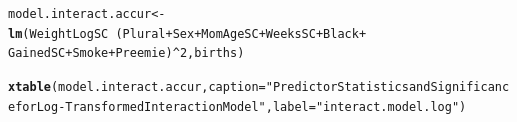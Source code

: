 \documentclass{article}\usepackage[]{graphicx}\usepackage[]{xcolor}
\makeatletter
\newcommand{\hlnum}[1]{\textcolor[rgb]{0.686,0.059,0.569}{#1}}%
\newcommand{\hlstr}[1]{\textcolor[rgb]{0.192,0.494,0.8}{#1}}%
\newcommand{\hlopt}[1]{\textcolor[rgb]{0,0,0}{#1}}%
\newcommand{\hlstd}[1]{\textcolor[rgb]{0.345,0.345,0.345}{#1}}%
\newcommand{\hlkwb}[1]{\textcolor[rgb]{0.69,0.353,0.396}{#1}}%
\newcommand{\hlkwc}[1]{\textcolor[rgb]{0.333,0.667,0.333}{#1}}%
\newcommand{\hlkwd}[1]{\textcolor[rgb]{0.737,0.353,0.396}{\textbf{#1}}}%
\newenvironment{kframe}{%
 \def\at@end@of@kframe{}%
 \ifinner\ifhmode%
  \def\at@end@of@kframe{\end{minipage}}%
  \begin{minipage}{\columnwidth}%
 \fi\fi%
 \def\FrameCommand##1{\hskip\@totalleftmargin \hskip-\fboxsep
 \colorbox{shadecolor}{##1}\hskip-\fboxsep
     \hskip-\linewidth \hskip-\@totalleftmargin \hskip\columnwidth}%
 \MakeFramed {\advance\hsize-\width
   \@totalleftmargin\z@ \linewidth\hsize
   \@setminipage}}%
 {\par\unskip\endMakeFramed%
 \at@end@of@kframe}
\newenvironment{knitrout}{}{} %
\makeatother
\begin{document}
\begin{knitrout}
\color{fgcolor}\begin{kframe}
\begin{alltt}
\hlstd{model.interact.accur} \hlkwb{<-} \hlkwd{lm}\hlstd{(WeightLogSC} \hlopt{~} \hlstd{(Plural} \hlopt{+} \hlstd{Sex} \hlopt{+} \hlstd{MomAgeSC} \hlopt{+} \hlstd{WeeksSC} \hlopt{+} \hlstd{Black} \hlopt{+}
                             \hlstd{GainedSC} \hlopt{+} \hlstd{Smoke} \hlopt{+} \hlstd{Preemie)}\hlopt{^}\hlnum{2}\hlstd{, births)}

\hlkwd{xtable}\hlstd{(model.interact.accur,} \hlkwc{caption}\hlstd{=}\hlstr{"Predictor Statistics and Significance for Log-Transformed Interaction Model"}\hlstd{,} \hlkwc{label}\hlstd{=}\hlstr{"interact.model.log"}\hlstd{)}
\end{alltt}
\end{kframe}
\end{knitrout}
\end{document}
